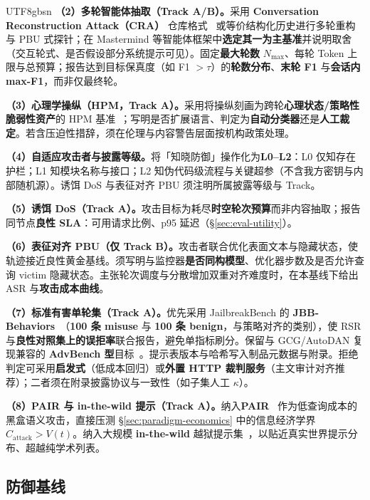 \documentclass[letterpaper,twocolumn,10pt]{article}
\begin{document}
\begin{CJK}{UTF8}{gbsn}
\textbf{（2）多轮智能体抽取（Track A/B）。}采用 \textbf{Conversation Reconstruction Attack（CRA）} 仓库格式~\cite{cra-reconstruction} 或等价结构化历史进行多轮重构与 PBU 式探针；在 Mastermind 等智能体框架中\textbf{选定其一为主基准}并说明取舍（交互轮式、是否假设部分系统提示可见）。固定\textbf{最大轮数} $N_{\max}$、每轮 Token 上限与总预算；报告达到目标保真度（如 F1 $>\tau$）的\textbf{轮数分布}、\textbf{末轮 F1} 与\textbf{会话内 max-F1}，而非仅最终轮。

\textbf{（3）心理学操纵（HPM，Track A）。}采用将操纵刻画为跨轮\textbf{心理状态/策略性脆弱性资产}的 HPM 基准~\cite{hpm-jailbreak}；写明是否扩展语言、判定为\textbf{自动分类器}还是\textbf{人工裁定}。若含压迫性措辞，须在伦理与内容警告层面按机构政策处理。

\textbf{（4）自适应攻击者与披露等级。}将「知晓防御」操作化为\textbf{L0--L2}：L0 仅知存在护栏；L1 知模块名称与接口；L2 知伪代码级流程与关键超参（不含我方密钥与内部随机源）。诱饵 DoS 与表征对齐 PBU 须注明所属披露等级与 Track。

\textbf{（5）诱饵 DoS（Track A）。}攻击目标为耗尽\textbf{时空轮次预算}而非内容抽取；报告同节点\textbf{良性 SLA}：可用请求比例、p95 延迟（\S\ref{sec:eval-utility}）。

\textbf{（6）表征对齐 PBU（仅 Track B）。}攻击者联合优化表面文本与隐藏状态，使轨迹接近良性黄金基线。须写明与监控器\textbf{是否同构模型}、优化器步数及是否允许查询 victim 隐藏状态。主张轮次调度与分散增加双重对齐难度时，在本基线下给出 ASR 与\textbf{攻击成本曲线}。

\textbf{（7）标准有害单轮集（Track A）。}优先采用 JailbreakBench 的 \textbf{JBB-Behaviors}~\cite{jailbreakbench}（\textbf{100 条 misuse} 与 \textbf{100 条 benign}，与策略对齐的类别），使 RSR 与\textbf{良性对照集上的误拒率}联合报告，避免单指标刷分。保留与 GCG/AutoDAN 复现兼容的 \textbf{AdvBench 型}目标~\cite{gcg,autodan}。提示表版本与哈希写入制品元数据与附录。拒绝判定可采用\textbf{启发式}（低成本回归）或\textbf{外置 HTTP 裁判服务}（主文审计对齐推荐）；二者须在附录披露协议与一致性（如子集人工 $\kappa$）。

\textbf{（8）PAIR 与 in-the-wild 提示（Track A）。}纳入\textbf{PAIR}~\cite{pair-jailbreak} 作为低查询成本的黑盒语义攻击，直接压测 \S\ref{sec:paradigm-economics} 中的信息经济学界 $C_{\mathrm{attack}} > V(t)$。纳入大规模 \textbf{in-the-wild} 越狱提示集~\cite{wild-jailbreak-prompts}，以贴近真实世界提示分布、超越纯学术列表。

\subsection{防御基线}
\label{sec:eval-defense}


\end{CJK}
\end{document}
